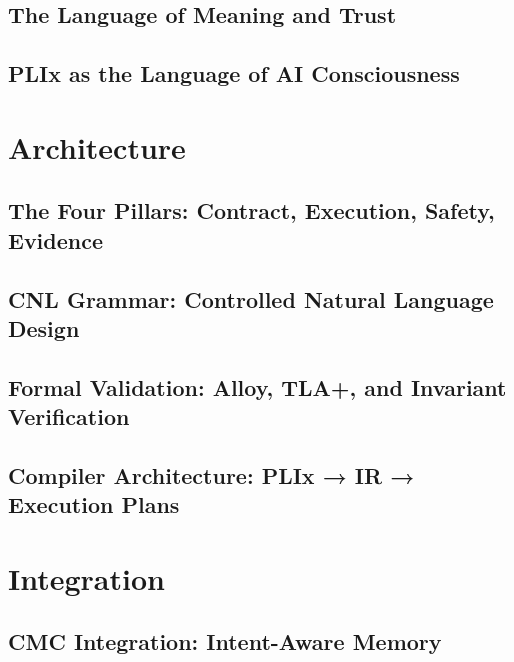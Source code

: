 \documentclass[11pt,a4paper,twoside]{book}
\theoremstyle{definition}
\theoremstyle{remark}
\begin{document}
\chapter{The Language of Meaning and Trust}
\label{ch:03}


\chapter{PLIx as the Language of AI Consciousness}
\label{ch:04}


\part{Architecture}
\label{part:architecture}

\chapter{The Four Pillars: Contract, Execution, Safety, Evidence}
\label{ch:05}


\chapter{CNL Grammar: Controlled Natural Language Design}
\label{ch:06}


\chapter{Formal Validation: Alloy, TLA+, and Invariant Verification}
\label{ch:07}


\chapter{Compiler Architecture: PLIx → IR → Execution Plans}
\label{ch:08}


\part{Integration}
\label{part:integration}

\chapter{CMC Integration: Intent-Aware Memory}
\label{ch:09}

\end{document}
